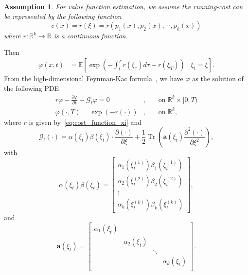 \documentclass[letterpaper]{article} %
\newtheorem{assumption}[theorem]{Assumption}
\begin{document}
\begin{assumption}
\label{asm:value_function_representation}
    For value function estimation, we assume the running-cost can be represented by the following function
\begin{equation}
\label{eq:cost_function_xi}
    c(x) = r(\xi) = r\left(p_1(x), p_2(x), \cdots, p_k(x)\right)
\end{equation}
where $r:\mathbb{R}^{k} \rightarrow \mathbb{R}$ is a continuous function.
\end{assumption}
Then
\begin{equation}
\label{eq:xi_value_function_high_dim}
\begin{aligned}
    \varphi(x, t) %
    & = \mathbb{E} \left[\exp \left(-\int_t^T r(\xi_\tau) d \tau - r(\xi_T)\right)  \mid \xi_t=\xi\right].
\end{aligned}
\end{equation}
From the high-dimensional Feynman-Kac formula~\cite[Theorem 1.3.17]{pham2009continuous}, we have $\varphi$ as the solution of the following PDE
\begin{equation}
\begin{aligned}
r \varphi -\frac{\partial \varphi}{\partial t}-\mathcal{G}_t \varphi =0&, & & \text { on } \mathbb{R}^k \times [0, T) \\
\varphi(\cdot,T) =\exp(-r(\cdot))&, & & \text { on } \mathbb{R}^k,
\end{aligned}
\end{equation}
where $r$ is given by~\eqref{eq:cost_function_xi} and
\begin{equation}
\label{eq:Gt_def}
   \mathcal{G}_t  (\cdot)=\alpha\left(\xi_t\right) \beta\left(\xi_t\right) \cdot \frac{\partial (\cdot)}{\partial \xi}
    +\frac{1}{2} \operatorname{Tr}\left(\mathbf{a}\left(\xi_t\right) \frac{\partial^2 (\cdot)}{\partial \xi^2}
    \right),
\end{equation}
with
\begin{equation}
    \alpha\left(\xi_t\right) \beta\left(\xi_t\right) = \begin{bmatrix}
    \alpha_1\left(\xi^{(1)}_t\right) \beta_1\left(\xi^{(1)}_t\right) \\
    \alpha_2\left(\xi^{(2)}_t\right) \beta_2\left(\xi^{(2)}_t\right) \\
    \vdots \\
    \alpha_k\left(\xi^{(k)}_t\right) \beta_k\left(\xi^{(k)}_t\right)
    \end{bmatrix},
\end{equation}
and
\begin{equation}
    \mathbf{a}\left(\xi_t\right) = \begin{bmatrix}
    \alpha_1\left(\xi_t\right) &  &  \\
    & \alpha_2\left(\xi_t\right) &  &  \\
    &  & \ddots &  \\
    &  &  & \alpha_k\left(\xi_t\right) \\
    \end{bmatrix}.
\end{equation}
\end{document}
